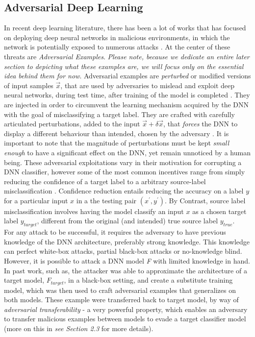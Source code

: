 \documentclass[grad,lot,lof,11pt,oneside,onehalfspace]{RUthesis}
\begin{document}
\subsection{Adversarial Deep Learning}  In recent deep learning literature, there has been a lot of works that has focused on deploying deep neural networks in malicious environments, in which the network is potentially exposed to numerous attacks  \cite{goodfellow_explaining_2015} \cite{kurakin_adversarial_2017}\cite{yuan_adversarial_2017}. At the center of these threats  are \textit{Adversarial Examples}. \textit{Please note, because we dedicate an entire later section to depicting what these examples are, we will focus only on the essential idea behind them for now}. Adversarial examples are \textit{perturbed} or modified versions of input samples $\vec{x}$, that are used by adversaries to mislead and exploit deep neural networks, during test time, after training of the model is completed \cite{papernot_distillation_2016}. They are injected in order to circumvent the learning mechanism acquired by the DNN with the goal of misclassifying a target label. They are crafted with carefully articulated perturbations, added to the input \textit{$\vec{x} + \delta\vec{x}$}, that \textit{forces} the DNN to display a different behaviour than intended, chosen by the adversary \cite{papernot_distillation_2016}. It is important to note that the magnitude of perturbations must be kept \textit{small enough} to have a significant effect on the DNN, yet remain unnoticed by a human being.
These adversarial exploitations vary in their motivation for corrupting a DNN classifier, however some of the most common incentives range from simply reducing the confidence of a target label to a arbitrary source-label misclassification \cite{papernot_distillation_2016}. Confidence reduction entails reducing the accuracy on a label $y$ for a particular input $x$ in a the testing pair \textit{$(x^{'},y^{'})$}. By Contrast, source label misclassification involves having the model classify an input ${x}$ as a chosen target label \textit{$y_{target}$}, different from the original (and intended) true source label \textit{$y_{true}$}. \\
For any attack to be successful, it requires the adversary to have previous knowledge of the DNN architecture, preferably strong knowledge. This knowledge can perfect white-box attacks, partial black-box attacks or no-knowledge blind. However, it is possible to attack a DNN model \textit{F} with limited knowledge in hand. In past work, such as\cite{papernot_distillation_2016}, the attacker was able to approximate the architecture of a target model, \textit{$F_{target}$}, in a black-box setting, and create a substitute training  model, which was then used to craft adversarial examples that generalizes on both models. These example were transferred back to target model, by way of \textit{adversarial transferability} \cite{papernot_distillation_2016} - a very powerful property, which enables an adversary to transfer malicious examples between models to evade a target classifier model (more on this in \textit{ see Section 2.3} for more details).
\end{document}
